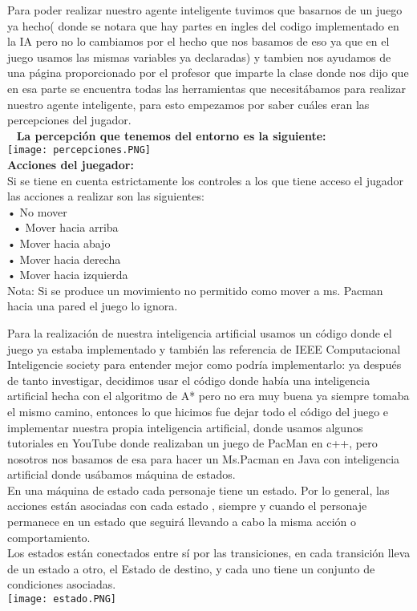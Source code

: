 \documentclass[11pt]{article}
\begin{document}
Para poder realizar nuestro agente inteligente tuvimos que basarnos de un juego ya hecho( donde se notara que hay partes en ingles del codigo implementado en la IA pero no lo cambiamos por el hecho que nos basamos de eso ya que en el juego usamos las mismas variables ya declaradas) y tambien nos ayudamos de una página proporcionado por el profesor que imparte la clase donde nos dijo que en esa parte se encuentra todas las herramientas que necesitábamos para realizar nuestro agente inteligente, para esto empezamos por saber cuáles eran las percepciones del jugador.\\\
\linebreak
\textbf{La percepción que tenemos del entorno es la siguiente:\\}
\linebreak
\texttt{[image: percepciones.PNG]}\\
\linebreak
\textbf{Acciones del juegador:\\}
\linebreak
Si se tiene en cuenta estrictamente los controles a los que tiene acceso el jugador las acciones a realizar son las siguientes:\\
•	No mover\\\
•	Mover hacia arriba\\
•	Mover hacia abajo\\
•	Mover hacia derecha\\
•	Mover hacia izquierda\\
\linebreak
Nota: Si se produce un movimiento no permitido como mover a ms. Pacman hacia una pared el juego lo ignora.



\newpage
Para la realización de nuestra inteligencia artificial usamos un código donde el juego ya estaba implementado y también las referencia de IEEE Computacional Inteligencie society para entender mejor como podría implementarlo: ya después de tanto investigar, decidimos usar el código donde había una inteligencia artificial hecha con el algoritmo de A*  pero no era muy buena ya siempre tomaba el mismo camino, entonces lo que hicimos fue dejar todo el código del juego e implementar nuestra propia inteligencia artificial, donde usamos algunos tutoriales en YouTube donde realizaban un juego de PacMan en c++, pero nosotros nos basamos de esa para hacer un Ms.Pacman en Java  con inteligencia artificial donde usábamos máquina de estados.\\
En una máquina de estado cada personaje tiene un estado. Por lo general, 
las acciones están asociadas con cada estado , siempre y cuando el personaje permanece en un estado que seguirá llevando a cabo la misma acción o comportamiento.\\
Los estados están conectados entre sí por las transiciones, en cada transición lleva de un estado a otro, el Estado de destino, y cada uno tiene un conjunto de condiciones asociadas.\\
\linebreak
\texttt{[image: estado.PNG]} 
\end{document}
